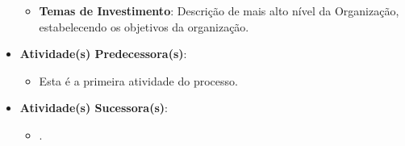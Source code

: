 \begin{itemize}
{\begin{itemize}
							\item{\textbf{Temas de Investimento}: Descrição de mais alto nível da Organização, estabelecendo os objetivos da organização.}
						\end{itemize}}
					\item{\textbf{Atividade(s) Predecessora(s)}:
						\begin{itemize}
							\item{Esta é a primeira atividade do processo.}
						\end{itemize}}
					\item{\textbf{Atividade(s) Sucessora(s)}:
						\begin{itemize}
							\item{.}
						\end{itemize}}
				\end{itemize}

